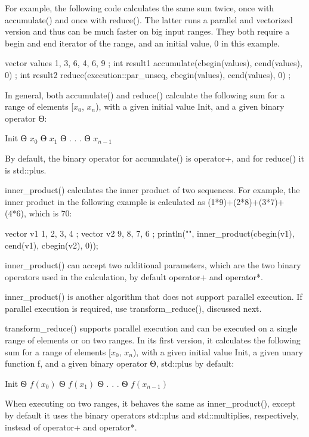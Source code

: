 For example, the following code calculates the same sum twice, once with accumulate() and once with reduce(). The latter runs a parallel and vectorized version and thus can be much faster on big input ranges. They both require a begin and end iterator of the range, and an initial value, 0 in this example.

\begin{cpp}
vector values { 1, 3, 6, 4, 6, 9 };
int result1 { accumulate(cbegin(values), cend(values), 0) };
int result2 { reduce(execution::par_unseq, cbegin(values), cend(values), 0) };
\end{cpp}

In general, both accumulate() and reduce() calculate the following sum for a range of elements [$x_0$, $x_{n}$), with a given initial value Init, and a given binary operator Ѳ:

Init Ѳ $x_0$ Ѳ $x_1$ Ѳ . . . Ѳ $x_{n−1}$

By default, the binary operator for accumulate() is operator+, and for reduce() it is std::plus.


inner\_product() calculates the inner product of two sequences. For example, the inner product in the following example is calculated as (1*9)+(2*8)+(3*7)+(4*6), which is 70:

\begin{cpp}
vector v1 { 1, 2, 3, 4 };
vector v2 { 9, 8, 7, 6 };
println("{}", inner_product(cbegin(v1), cend(v1), cbegin(v2), 0));
\end{cpp}

inner\_product() can accept two additional parameters, which are the two binary operators used in the calculation, by default operator+ and operator*.

inner\_product() is another algorithm that does not support parallel execution. If parallel execution is required, use transform\_reduce(), discussed next.


transform\_reduce() supports parallel execution and can be executed on a single range of elements or on two ranges. In its first version, it calculates the following sum for a range of elements [$x_0$, $x_n$), with a given initial value Init, a given unary function f, and a given binary operator Ѳ, std::plus by default:

Init Ѳ $f(x_0)$ Ѳ $f(x_1)$ Ѳ . . . Ѳ $f(x_{n−1})$

When executing on two ranges, it behaves the same as inner\_product(), except by default it uses the binary operators std::plus and std::multiplies, respectively, instead of operator+ and operator*.

